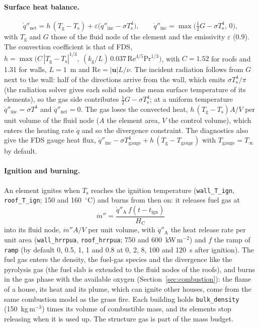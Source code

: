 \documentclass[11pt,a4paper]{article}
\newcommand{\vu}{\mathbf{u}}
\newcommand{\code}[1]{\texttt{#1}}
\begin{document}
\paragraph{Surface heat balance.}
\begin{equation}
  \dot q''_\text{net}=h\,(T_\text{g}-T_\text{s})+\varepsilon\big(\dot q''_\text{inc}-\sigma T_\text{s}^4\big),\qquad
  \dot q''_\text{inc}=\max\big(\tfrac12G-\sigma T_\text{s}^4,\,0\big),
\end{equation}
with $T_\text{g}$ and $G$ those of the fluid node of the element and the emissivity $\varepsilon$ (0.9). The
convection coefficient is that of FDS, $h=\max\big(C\,|T_\text{g}-T_\text{s}|^{1/3},\ (k_\text{g}/L)\,0.037\,
\mathrm{Re}^{4/5}\mathrm{Pr}^{1/3}\big)$, with $C=1.52$ for roofs and 1.31 for walls, $L=1$~m and $\mathrm{Re}=|\vu|L/\nu$.
The incident radiation follows from $G$ next to the wall: half of the directions arrive from the wall, which
emits $\sigma T_\text{s}^4/\pi$ (the radiation solver gives each solid node the mean surface temperature of its
elements), so the gas side contributes $\frac12G-\sigma T_\text{s}^4$; at a uniform temperature
$\dot q''_\text{inc}=\sigma T^4$ and $\dot q''_\text{net}=0$. The gas loses the convected heat,
$h\,(T_\text{g}-T_\text{s})A/V$ per unit volume of the fluid node ($A$ the element area, $V$ the control volume),
which enters the heating rate $\dot q$ and so the divergence constraint. The diagnostics also give the FDS
gauge heat flux, $\dot q''_\text{inc}-\sigma T_\text{gauge}^4+h\,(T_\text{g}-T_\text{gauge})$ with
$T_\text{gauge}=T_\infty$ by default.

\paragraph{Ignition and burning.} An element ignites when $T_\text{s}$ reaches the ignition temperature
(\code{wall\_T\_ign}, \code{roof\_T\_ign}; 150 and 160~$^\circ$C) and burns from then on: it releases fuel gas at
\begin{equation}
  \dot m''=\frac{\dot q''_\text{A}\,f(t-t_\text{ign})}{H_\text{C}}
\end{equation}
into its fluid node, $\dot m''A/V$ per unit volume, with $\dot q''_\text{A}$ the heat release rate per unit
area (\code{wall\_hrrpua}, \code{roof\_hrrpua}; 750 and 600~kW\,m$^{-2}$) and $f$ the ramp of \code{ramp} (by
default 0, 0.5, 1, 1 and 0.8 at 0, 2, 8, 100 and 120~s after ignition). The fuel gas enters the density, the
fuel-gas species and the divergence like the pyrolysis gas (the fuel slab is extended to the fluid nodes of
the roofs), and burns in the gas phase with the available oxygen (Section~\ref{sec:combustion}): the flame
of a house, its heat and its plume, which can ignite other houses, come from the same combustion model as
the grass fire. Each building holds \code{bulk\_density} (150~kg\,m$^{-3}$) times its volume of combustible
mass, and its elements stop releasing when it is used up. The structure gas is part of the mass budget.
\end{document}
